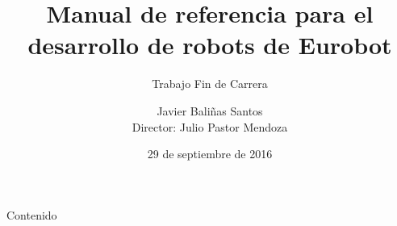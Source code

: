 \documentclass{beamer}
\title[Manual de referencia para el desarrollo de robots de Eurobot] %
{Manual de referencia para el desarrollo de robots de Eurobot}
\subtitle
{Trabajo Fin de Carrera} %
\author[Javier Baliñas Santos] %
{
	Javier Baliñas Santos\\ 
	Director: Julio Pastor Mendoza
}
\institute[Universities of Somewhere and Elsewhere] %
{
	\textsc{Departamento de Electrónica}\\
	\vspace{.5cm} 
	\texttt{[image: logoUAHazul]}\\ 
	\textsc{Universidad de Alcalá}
}
\date[29 de septiembre de 2016] %
{29 de septiembre de 2016}
\begin{document}
\begin{frame}
  \titlepage
\end{frame}

\begin{frame}{Contenido}
	\setcounter{tocdepth}{1}
	\tableofcontents%
\end{frame}








\end{document}
